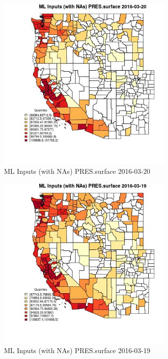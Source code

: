 \begin{figure} 
\centering  
\includegraphics[width=0.77\textwidth]{Code_Outputs/Report_ML_input_PM25_Step4_part_e_de_duplicated_aveswNAs_CountyPRESsurfaceMean2016-03-20_2016-03-20.jpg} 
\caption{\label{fig:Report_ML_input_PM25_Step4_part_e_de_duplicated_aveswNAsCountyPRESsurfaceMean2016-03-20_2016-03-20}ML Inputs (with NAs) PRES.surface 2016-03-20} 
\end{figure} 
 

\begin{figure} 
\centering  
\includegraphics[width=0.77\textwidth]{Code_Outputs/Report_ML_input_PM25_Step4_part_e_de_duplicated_aveswNAs_CountyPRESsurfaceMean2016-03-19_2016-03-19.jpg} 
\caption{\label{fig:Report_ML_input_PM25_Step4_part_e_de_duplicated_aveswNAsCountyPRESsurfaceMean2016-03-19_2016-03-19}ML Inputs (with NAs) PRES.surface 2016-03-19} 
\end{figure} 
 

